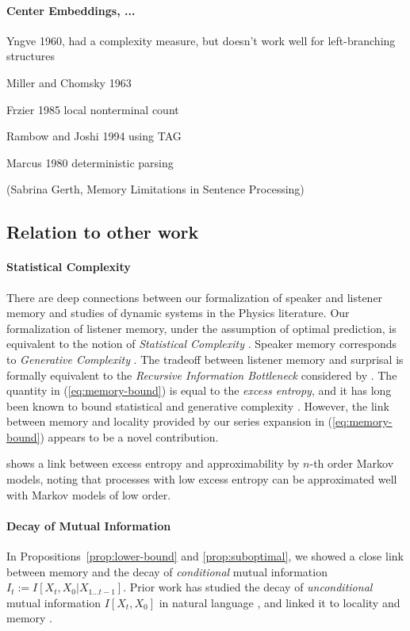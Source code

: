 \documentclass[11pt,letterpaper]{article}
\begin{document}
\paragraph{Center Embeddings, ...}
Yngve 1960, had a complexity measure, but doesn't work well for left-branching structures

Miller and Chomsky 1963

Frzier 1985 local nonterminal count

Rambow and Joshi 1994 using TAG

Marcus 1980 deterministic parsing

(Sabrina Gerth, Memory Limitations in Sentence Processing)


\subsection{Relation to other work}

\paragraph{Statistical Complexity}
There are deep connections between our formalization of speaker and listener memory and studies of dynamic systems in the Physics literature.
Our formalization of listener memory, under the assumption of optimal prediction, is equivalent to the notion of \emph{Statistical Complexity} \citep{crutchfield-inferring-1989}.
Speaker memory corresponds to \emph{Generative Complexity} \cite{loehr-non-sufficient-2008, loehr-predictive-2010}.
The tradeoff between listener memory and surprisal is formally equivalent to the \emph{Recursive Information Bottleneck} considered by \cite{still-information-2014}.
The quantity in (\ref{eq:memory-bound}) is equal to the \emph{excess entropy}, and it has long been known to bound statistical and generative complexity \citep{crutchfield-inferring-1989}.
However, the link between memory and locality provided by our series expansion in (\ref{eq:memory-bound}) appears to be a novel contribution.


\cite{sharan-prediction-2016} shows a link between excess entropy and approximability by $n$-th order Markov models, noting that processes with low excess entropy can be approximated well with Markov models of low order.



\paragraph{Decay of Mutual Information}
In Propositions~\ref{prop:lower-bound} and \ref{prop:suboptimal}, we showed a close link between memory and the decay of \emph{conditional} mutual information $I_t := I[X_t, X_0 | X_{1\dots t-1}]$.
Prior work has studied the decay of \emph{unconditional} mutual information $I[X_t, X_0]$ in natural language \citep{ebeling-entropy-1994,lin-critical-2017}, and linked it to locality and memory \citep{futrell-noisy-context-2017}.
\end{document}
